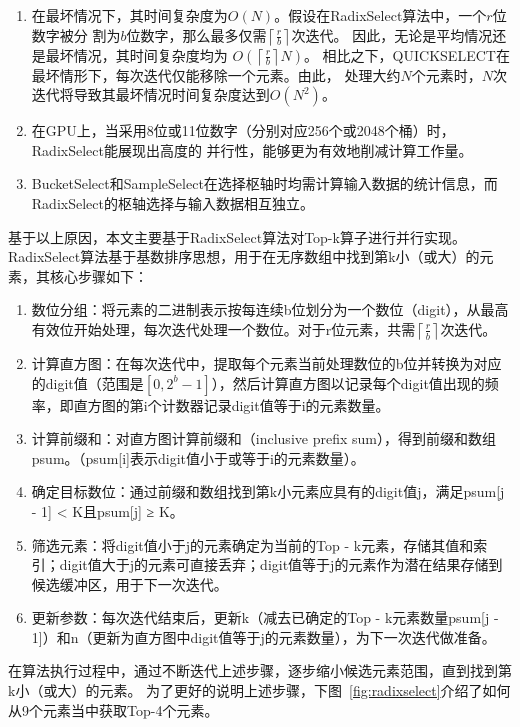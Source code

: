\begin{enumerate}
\item 在最坏情况下，其时间复杂度为$O(N)$。假设在RadixSelect算法中，一个$r$位数字被分
割为$b$位数字，那么最多仅需$\left\lceil\frac{r}{b}\right\rceil$次迭代。
因此，无论是平均情况还是最坏情况，其时间复杂度均为
$O(\left\lceil\frac{r}{b}\right\rceil N)$。
相比之下，QUICKSELECT在最坏情形下，每次迭代仅能移除一个元素。由此，
处理大约$N$个元素时，$N$次迭代将导致其最坏情况时间复杂度达到$O(N^{2})$。

\item 在GPU上，当采用8位或11位数字（分别对应256个或2048个桶）时，RadixSelect能展现出高度的
并行性，能够更为有效地削减计算工作量。

\item BucketSelect和SampleSelect在选择枢轴时均需计算输入数据的统计信息，而RadixSelect的枢轴选择与输入数据相互独立。

\end{enumerate}
基于以上原因，本文主要基于RadixSelect算法对Top-k算子进行并行实现。
RadixSelect算法基于基数排序思想，用于在无序数组中找到第k小（或大）的元素，其核心步骤如下：
\begin{enumerate}
    \item {数位分组}：将元素的二进制表示按每连续b位划分为一个数位（digit），从最高有效位开始处理，每次迭代处理一个数位。对于r位元素，共需$\left\lceil\frac{r}{b}\right\rceil$次迭代。
    \item  {计算直方图}：在每次迭代中，提取每个元素当前处理数位的b位并转换为对应的digit值（范围是$[0, 2^{b}-1]$），然后计算直方图以记录每个digit值出现的频率，即直方图的第i个计数器记录digit值等于i的元素数量。
    \item  {计算前缀和}：对直方图计算前缀和（inclusive prefix sum），得到前缀和数组psum。（psum[i]表示digit值小于或等于i的元素数量）。
    \item  {确定目标数位}：通过前缀和数组找到第k小元素应具有的digit值j，满足psum[j - 1] < K且psum[j] ≥ K。
    \item  {筛选元素}：将digit值小于j的元素确定为当前的Top - k元素，存储其值和索引；digit值大于j的元素可直接丢弃；digit值等于j的元素作为潜在结果存储到候选缓冲区，用于下一次迭代。
    \item  {更新参数}：每次迭代结束后，更新k（减去已确定的Top - k元素数量psum[j - 1]）和n（更新为直方图中digit值等于j的元素数量），为下一次迭代做准备。
\end{enumerate}
在算法执行过程中，通过不断迭代上述步骤，逐步缩小候选元素范围，直到找到第k小（或大）的元素。
为了更好的说明上述步骤，下图~\ref{fig:radixselect}介绍了如何从9个元素当中获取Top-4个元素。

